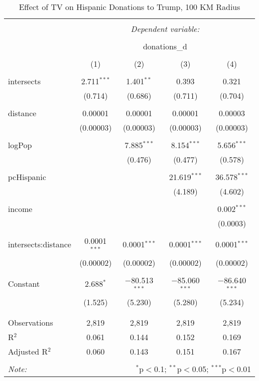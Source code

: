 
\begin{table}[!htbp] \centering 
  \caption{Effect of TV on Hispanic Donations to Trump, 100 KM Radius} 
  \label{} 
\begin{tabular}{@{\extracolsep{-5pt}}lcccc} 
\\[-1.8ex]\hline 
\hline \\[-1.8ex] 
 & \multicolumn{4}{c}{\textit{Dependent variable:}} \\ 
\cline{2-5} 
\\[-1.8ex] & \multicolumn{4}{c}{donations\_d} \\ 
\\[-1.8ex] & (1) & (2) & (3) & (4)\\ 
\hline \\[-1.8ex] 
 intersects & 2.711$^{***}$ & 1.401$^{**}$ & 0.393 & 0.321 \\ 
  & (0.714) & (0.686) & (0.711) & (0.704) \\ 
  & & & & \\ 
 distance & 0.00001 & 0.00001 & 0.00001 & 0.00003 \\ 
  & (0.00003) & (0.00003) & (0.00003) & (0.00003) \\ 
  & & & & \\ 
 logPop &  & 7.885$^{***}$ & 8.154$^{***}$ & 5.656$^{***}$ \\ 
  &  & (0.476) & (0.477) & (0.578) \\ 
  & & & & \\ 
 pcHispanic &  &  & 21.619$^{***}$ & 36.578$^{***}$ \\ 
  &  &  & (4.189) & (4.602) \\ 
  & & & & \\ 
 income &  &  &  & 0.002$^{***}$ \\ 
  &  &  &  & (0.0003) \\ 
  & & & & \\ 
 intersects:distance & 0.0001$^{***}$ & 0.0001$^{***}$ & 0.0001$^{***}$ & 0.0001$^{***}$ \\ 
  & (0.00002) & (0.00002) & (0.00002) & (0.00002) \\ 
  & & & & \\ 
 Constant & 2.688$^{*}$ & $-$80.513$^{***}$ & $-$85.060$^{***}$ & $-$86.640$^{***}$ \\ 
  & (1.525) & (5.230) & (5.280) & (5.234) \\ 
  & & & & \\ 
\hline \\[-1.8ex] 
Observations & 2,819 & 2,819 & 2,819 & 2,819 \\ 
R$^{2}$ & 0.061 & 0.144 & 0.152 & 0.169 \\ 
Adjusted R$^{2}$ & 0.060 & 0.143 & 0.151 & 0.167 \\ 
\hline 
\hline \\[-1.8ex] 
\textit{Note:}  & \multicolumn{4}{r}{$^{*}$p$<$0.1; $^{**}$p$<$0.05; $^{***}$p$<$0.01} \\ 
\end{tabular} 
\end{table} 

